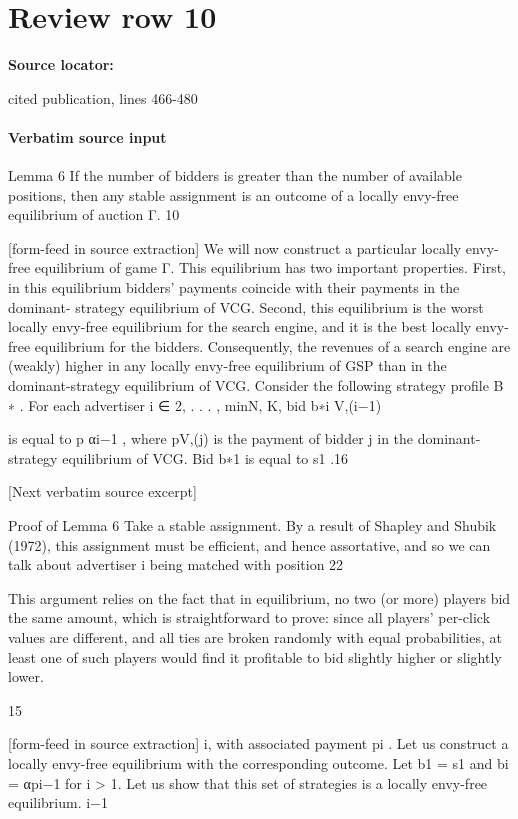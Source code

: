 \documentclass[10pt]{article}
\begin{document}
\section*{Review row 10}
\textbf{Source locator:} {\footnotesize\raggedright cited publication, lines 466-\allowbreak{}480\par}
\paragraph{Verbatim source input}
\begin{ReviewVerbatim}
Lemma 6 If the number of bidders is greater than the number of available positions, then any
stable assignment is an outcome of a locally envy-free equilibrium of auction Γ.
10


[form-feed in source extraction]
We will now construct a particular locally envy-free equilibrium of game Γ. This equilibrium
has two important properties. First, in this equilibrium bidders’ payments coincide with their
payments in the dominant- strategy equilibrium of VCG. Second, this equilibrium is the worst
locally envy-free equilibrium for the search engine, and it is the best locally envy-free equilibrium
for the bidders. Consequently, the revenues of a search engine are (weakly) higher in any locally
envy-free equilibrium of GSP than in the dominant-strategy equilibrium of VCG.
Consider the following strategy profile B ∗ . For each advertiser i ∈ {2, . . . , min{N, K}}, bid b∗i
V,(i−1)

is equal to p αi−1 , where pV,(j) is the payment of bidder j in the dominant-strategy equilibrium of
VCG. Bid b∗1 is equal to s1 .16

[Next verbatim source excerpt]

Proof of Lemma 6
Take a stable assignment. By a result of Shapley and Shubik (1972), this assignment must be
efficient, and hence assortative, and so we can talk about advertiser i being matched with position
22

This argument relies on the fact that in equilibrium, no two (or more) players bid the same amount, which is
straightforward to prove: since all players’ per-click values are different, and all ties are broken randomly with equal
probabilities, at least one of such players would find it profitable to bid slightly higher or slightly lower.

15


[form-feed in source extraction]
i, with associated payment pi .
Let us construct a locally envy-free equilibrium with the corresponding outcome. Let b1 = s1
and bi = αpi−1
for i > 1. Let us show that this set of strategies is a locally envy-free equilibrium.
i−1


\end{ReviewVerbatim}
\end{document}
